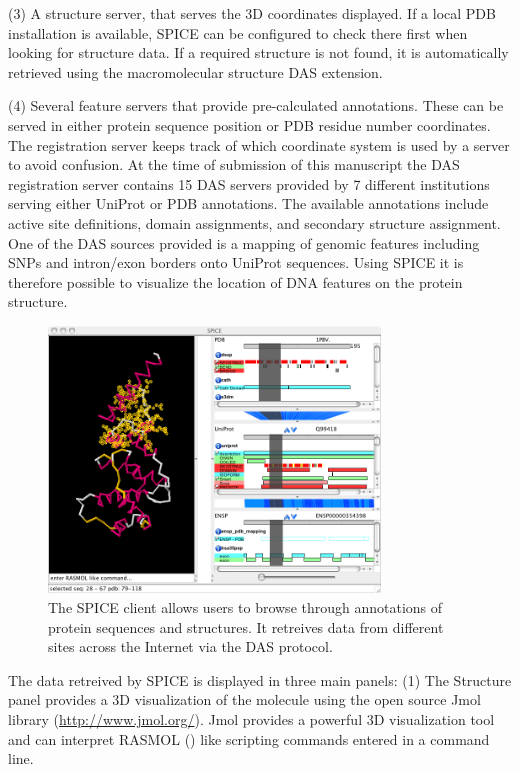 \documentclass{bioinfo}
\begin{document}
(3) A structure server, that serves the 3D coordinates displayed.  If a local 
PDB installation is available, SPICE can be configured to check there first when
looking for structure data.  If a required structure is not found, it is
automatically retrieved using the macromolecular structure DAS extension. 
 
(4) Several feature servers that provide pre-calculated annotations. These can
be served in either protein sequence position or PDB residue number coordinates. 
The registration server keeps track of which coordinate system is used by a
server to avoid confusion. At the time of submission of this manuscript the DAS
registration server contains 15 DAS servers provided by 7 different institutions
serving either UniProt or PDB annotations. The available annotations include 
active site definitions, domain assignments, and secondary structure
assignment. One of the DAS sources provided is a mapping of genomic features including
SNPs and intron/exon borders onto UniProt sequences. Using SPICE it is therefore
possible to visualize the location of DNA features on the protein structure.

\begin{figure}
\centerline{\includegraphics[width=250pt]{spice.png}}
\caption{The SPICE client allows users to browse through annotations of protein sequences and structures. It retreives data from different sites across the Internet via the DAS protocol.}\label{fig:01}
\end{figure}


The data retreived by SPICE is displayed in three main panels:
(1) The Structure panel provides a 3D visualization of the molecule using the
open source Jmol library (\href{http://www.jmol.org/}{http://www.jmol.org/}).
Jmol provides a powerful 3D visualization tool and can interpret 
RASMOL (\cite{rasmol:1995}) like scripting commands entered in a command line. 
\end{document}

